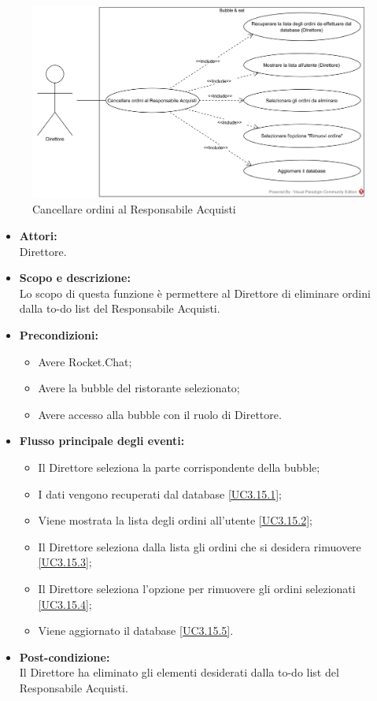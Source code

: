 
\begin{figure}[H]
	\centering
	\includegraphics[width=15cm]{../../documenti/AnalisiDeiRequisiti/Diagrammi_img/uc3_15.png}
	\caption{\UCCaption{} Cancellare ordini al Responsabile Acquisti}
\end{figure}

\begin{itemize}
	\item \textbf{Attori:}
	\\Direttore.
	\item \textbf{Scopo e descrizione:} 
	\\Lo scopo di questa funzione è permettere al Direttore di eliminare ordini dalla to-do list del Responsabile Acquisti.
	\item \textbf{Precondizioni:}
	\begin{itemize}
		\item Avere Rocket.Chat;
		\item Avere la bubble del ristorante selezionato;
		\item Avere accesso alla bubble con il ruolo di Direttore.
	\end{itemize}
	\item \textbf{Flusso principale degli eventi:}
	\begin{itemize}
		\item Il Direttore seleziona la parte corrispondente della bubble;
		\item I dati vengono recuperati dal database \ref{UC3.15.1};
		\item Viene mostrata la lista degli ordini all'utente \ref{UC3.15.2};
		\item Il Direttore seleziona dalla lista gli ordini che si desidera rimuovere \ref{UC3.15.3};
		\item Il Direttore seleziona l'opzione per rimuovere gli ordini selezionati \ref{UC3.15.4};
		\item Viene aggiornato il database \ref{UC3.15.5}.
	\end{itemize}
	\item \textbf{Post-condizione:}
	\\Il Direttore ha eliminato gli elementi desiderati dalla to-do list del Responsabile Acquisti.
\end{itemize}

